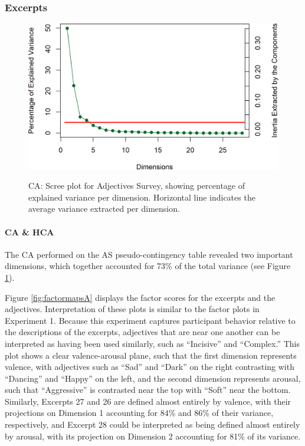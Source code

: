 \documentclass[
  english,
  man]{apa6}
\let\oldparagraph\paragraph
\renewcommand{\paragraph}[1]{\oldparagraph{#1}\mbox{}}
\begin{document}
\hypertarget{excerpts-1}{%
\subsubsection{Excerpts}\label{excerpts-1}}

\begin{figure}  
  \begin{center}
  \caption{CA: Scree plot for Adjectives Survey, showing percentage of explained variance per dimension. Horizontal line indicates the average variance extracted per dimension.}
    \includegraphics[width=0.6\columnwidth]{./Music-Descriptor-Space_files/figure-latex/scree4descriptorscode-1.png}
  \label{fig:scree4descriptors}  
 \end{center}
\end{figure}

\hypertarget{ca-hca}{%
\paragraph{CA \& HCA}\label{ca-hca}}

The CA performed on the AS pseudo-contingency table revealed two important dimensions, which together accounted for 73\% of the total variance (see Figure \ref{fig:scree4descriptors}).

Figure \ref{fig:factormapsA} displays the factor scores for the excerpts and the adjectives. Interpretation of these plots is similar to the factor plots in Experiment 1. Because this experiment captures participant behavior relative to the descriptions of the excerpts, adjectives that are near one another can be interpreted as having been used similarly, such as ``Incisive'' and ``Complex.'' This plot shows a clear valence-arousal plane, such that the first dimension represents valence, with adjectives such as ``Sad'' and ``Dark'' on the right contrasting with ``Dancing'' and ``Happy'' on the left, and the second dimension represents arousal, such that ``Aggressive'' is contrasted near the top with ``Soft'' near the bottom. Similarly, Excerpts 27 and 26 are defined almost entirely by valence, with their projections on Dimension 1 accounting for 84\% and 86\% of their variance, respectively, and Excerpt 28 could be interpreted as being defined almost entirely by arousal, with its projection on Dimension 2 accounting for 81\% of its variance.
\end{document}
